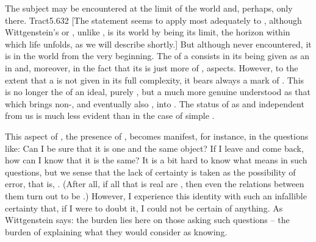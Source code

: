 The subject may be encountered at the limit of the world and, perhaps, only
there. \citet{The subject does not belong to the world: rather it is a limit of
  the world.}{Tract}{5.632 [The statement seems to apply most adequately to
  , although Wittgenstein's  or 
   , unlike , is
  its world by being its limit, the horizon within which life unfolds, as we
  will describe shortly.]}
%
%
But although never  encountered, it is  in the world
from the very beginning.  The 
 of a  consists in its being given as an 
in  and, moreover, in the fact that its  is just
more of ,  aspects. However, to the extent that a
 is not given  in its full complexity, it bears
always a mark of . This is no longer the  of
an ideal, purely , but a much more genuine 
understood as that which brings non-, and eventually also
, into .  The status of  as
 and independent from us is much less evident than in the case of
simple .

This aspect of , the presence of , becomes manifest,
for instance, in the questions like: Can I be sure that it is one and the same
object? If I leave and come back, how can I know that it is the same? It is a
bit hard to know what  means in such questions, but we sense that
the lack of  certainty is taken as the possibility of error, that
is, . (After all, if all that is real are , then even the relations between them turn out to be
.)  However, I experience this identity with such an infallible
certainty that, if I were to doubt it, I could not be certain of anything. As
Wittgenstein says: the burden lies here on those asking such questions -- the
burden of explaining what they would consider as knowing.

